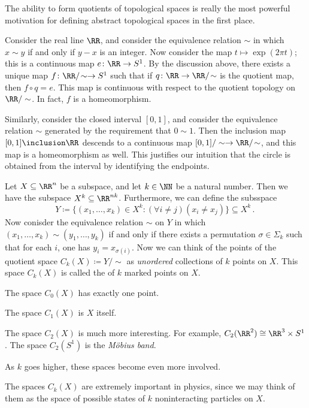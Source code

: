 The ability to form quotients of topological spaces is really the most powerful motivation for defining abstract topological spaces in the first place.

\begin{exm}
	Consider the real line $\RR$, and consider the equivalence relation $\sim$ in which $x \sim y $ if and only if $y-x$ is an integer.
	Now consider the map $t \mapsto \exp(2\pi t)$; this is a continuous map $e \colon \RR \to S^1$.
	By the discussion above, there exists a unique map $ f \colon \RR/\!\sim \to S^1$ such that if $q \colon \RR \to \RR/\!\sim $ is the quotient map, then $f \circ q = e$.
	This map is continuous with respect to the quotient topology on $\RR/\sim$.
	In fact, $f$ is a homeomorphism.

	Similarly, consider the closed interval $[0,1]$, and consider the equivalence relation $\sim$ generated by the requirement that $0\sim 1$.
	Then the inclusion map $[0,1] \inclusion \RR$ descends to a continuous map $[0,1]/\sim \to \RR/\!\sim$, and this map is a homeomorphism as well.
	This justifies our intuition that the circle is obtained from the interval by identifying the endpoints.
\end{exm}

\begin{exm}
	Let $X \subseteq \RR^n$ be a subspace, and let $k \in \NN$ be a natural number.
	Then we have the subspace $X^k \subseteq \RR^{nk}$.
	Furthermore, we can define the subsspace
	\[
		Y \coloneq \{(x_1,\dots,x_k) \in X^k : (\forall i \neq j)(x_i \neq x_j) \} \subseteq X^k \period
	\]
	Now conisder the equivalence relation $\sim$ on $Y$ in which $(x_1, \dots, x_k) \sim (y_1,\dots, y_k)$ if and only if there exists a permutation%
	$\sigma \in \Sigma_k$ such that for each $i$, one has $y_i = x_{\sigma(i)}$.
	Now we can think of the points of the quotient space $C_k(X) \coloneq Y/\!\sim$ as \emph{unordered} collections of $k$ points on $X$.
	This space $C_k(X)$ is called the  of $k$ marked points on $X$.

	The space $C_0(X)$ has exactly one point.

	The space $C_1(X)$ is $X$ itself.

	The space $C_2(X)$ is much more interesting.
	For example, $C_2(\RR^2) \cong \RR^3 \times S^1$.
	The space $C_2(S^1)$ is the \emph{Möbius band}.

	As $k$ goes higher, these spaces become even more involved.

	The spaces $C_k(X)$ are extremely important in physics, since we may think of them as the space of possible states of $k$ noninteracting particles on $X$.
\end{exm}

